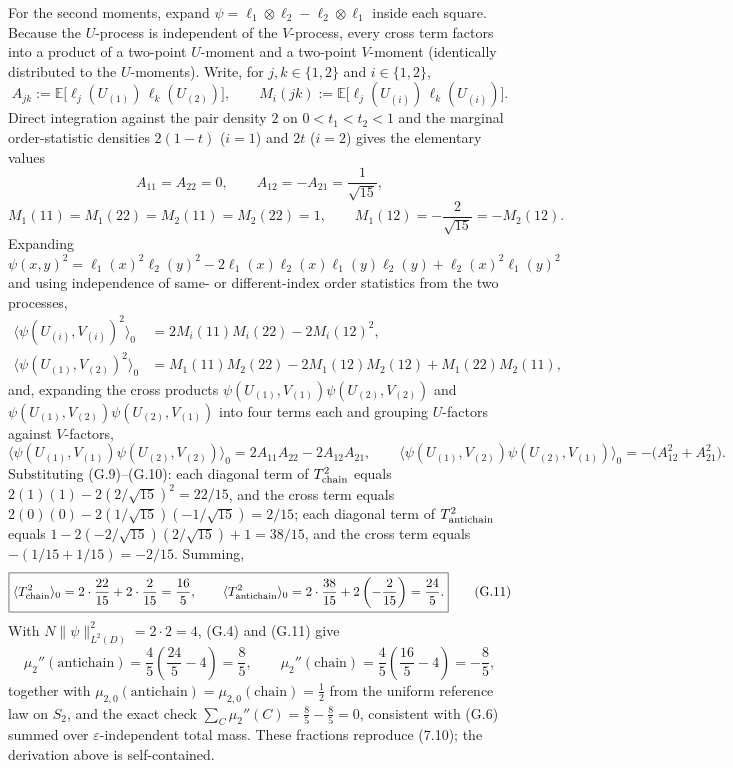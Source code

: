 \documentclass[11pt]{article}
\begin{document}
For the second moments, expand \(\psi=\ell_1\otimes\ell_2-\ell_2\otimes \ell_1\) inside each square. Because the \(U\)-process is independent of the \(V\)-process, every cross term factors into a product of a two-point \(U\)-moment and a two-point \(V\)-moment (identically distributed to the \(U\)-moments). Write, for \(j,k\in\{1,2\}\) and \(i\in\{1,2\}\), \[ A_{jk}:=\mathbb E\bigl[\ell_j(U_{(1)})\,\ell_k(U_{(2)})\bigr], \qquad M_i(jk):=\mathbb E\bigl[\ell_j(U_{(i)})\,\ell_k(U_{(i)})\bigr]. \tag{G.8} \] Direct integration against the pair density \(2\) on \(0<t_1<t_2<1\) and the marginal order-statistic densities \(2(1-t)\) (\(i=1\)) and \(2t\) (\(i=2\)) gives the elementary values \[ A_{11}=A_{22}=0, \qquad A_{12}=-A_{21}=\frac1{\sqrt{15}}, \tag{G.9} \] \[ M_1(11)=M_1(22)=M_2(11)=M_2(22)=1, \qquad M_1(12)=-\frac2{\sqrt{15}}=-M_2(12). \tag{G.10} \] Expanding \(\psi(x,y)^2=\ell_1(x)^2\ell_2(y)^2 -2\ell_1(x)\ell_2(x)\ell_1(y)\ell_2(y)+\ell_2(x)^2\ell_1(y)^2\) and using independence of same- or different-index order statistics from the two processes, \[ \begin{aligned} \bigl\langle\psi(U_{(i)},V_{(i)})^2\bigr\rangle_0 &=2M_i(11)M_i(22)-2M_i(12)^2,\\ \bigl\langle\psi(U_{(1)},V_{(2)})^2\bigr\rangle_0 &=M_1(11)M_2(22)-2M_1(12)M_2(12)+M_1(22)M_2(11), \end{aligned} \] and, expanding the cross products \(\psi(U_{(1)},V_{(1)})\psi(U_{(2)},V_{(2)})\) and \(\psi(U_{(1)},V_{(2)})\psi(U_{(2)},V_{(1)})\) into four terms each and grouping \(U\)-factors against \(V\)-factors, \[ \bigl\langle\psi(U_{(1)},V_{(1)})\psi(U_{(2)},V_{(2)})\bigr\rangle_0 =2A_{11}A_{22}-2A_{12}A_{21}, \qquad \bigl\langle\psi(U_{(1)},V_{(2)})\psi(U_{(2)},V_{(1)})\bigr\rangle_0 =-\bigl(A_{12}^2+A_{21}^2\bigr). \] Substituting (G.9)--(G.10): each diagonal term of \(T_{\rm chain}^2\) equals \(2(1)(1)-2(2/\sqrt{15})^2=22/15\), and the cross term equals \(2(0)(0)-2(1/\sqrt{15})(-1/\sqrt{15})=2/15\); each diagonal term of \(T_{\rm antichain}^2\) equals \(1-2(-2/\sqrt{15})(2/\sqrt{15})+1=38/15\), and the cross term equals \(-(1/15+1/15)=-2/15\). Summing, \[ \boxed{ \langle T_{\rm chain}^2\rangle_0 =2\cdot\frac{22}{15}+2\cdot\frac2{15}=\frac{16}5, \qquad \langle T_{\rm antichain}^2\rangle_0 =2\cdot\frac{38}{15}+2\left(-\frac2{15}\right)=\frac{24}5. } \tag{G.11} \] With \(N\|\psi\|_{L^2(D)}^2=2\cdot2=4\), (G.4) and (G.11) give \[ \boxed{ \mu_2''(\mathrm{antichain})=\frac45\left(\frac{24}5-4\right)=\frac85, \qquad \mu_2''(\mathrm{chain})=\frac45\left(\frac{16}5-4\right)=-\frac85, } \tag{G.12} \] together with \(\mu_{2,0}(\mathrm{antichain})=\mu_{2,0}(\mathrm{chain}) =\tfrac12\) from the uniform reference law on \(S_2\), and the exact check \(\sum_C\mu_2''(C)=\tfrac85-\tfrac85=0\), consistent with (G.6) summed over \(\varepsilon\)-independent total mass. These fractions reproduce (7.10); the derivation above is self-contained.
\end{document}
